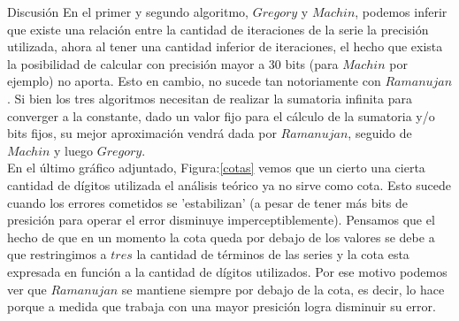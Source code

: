 \begin{section}{Discusión}
	En el primer y segundo algoritmo, $Gregory$ y $Machin$, podemos inferir que existe una relación entre la cantidad de iteraciones de la serie la precisión utilizada, ahora al tener una cantidad inferior de iteraciones, el hecho que exista la posibilidad de calcular con precisión mayor a 30 bits (para $Machin$ por ejemplo) no aporta. Esto en cambio, no sucede tan notoriamente con $Ramanujan$. Si bien los tres algoritmos necesitan de realizar la sumatoria infinita para converger a la constante, dado un valor fijo para el cálculo de la sumatoria y/o bits fijos, su mejor aproximación vendrá dada por $Ramanujan$, seguido de $Machin$ y luego $Gregory$.
	\\
	
	En el último gráfico adjuntado, Figura:\ref{cotas} vemos que un cierto una cierta cantidad de dígitos utilizada el análisis teórico ya no sirve como cota. Esto sucede cuando los errores cometidos se 'estabilizan' (a pesar de tener más bits de presición para operar el error disminuye imperceptiblemente).
	Pensamos que el hecho de que en un momento la cota queda por debajo de los valores se debe a que restringimos a $tres$ la cantidad de términos de las series y la cota esta expresada en función a la cantidad de dígitos utilizados.
	Por ese motivo podemos ver que $Ramanujan$ se mantiene siempre por debajo de la cota, es decir, lo hace porque a medida que trabaja con una mayor presición logra disminuir su error.
\end{section}
